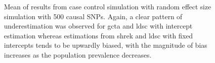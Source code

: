 \begin{figure}
{				
				\label{fig:ldscInCC500RandMean}
			}
			\caption[Mean of Case Control Simulation Results (500 Causal)]
			{Mean of results from case control simulation with random effect size simulation with 500 causal \glspl{SNP}.
				Again, a clear pattern of underestimation was observed for \gls{gcta} and \gls{ldsc} with intercept estimation whereas estimations from \gls{shrek} and \gls{ldsc} with fixed intercepts tends to be upwardly biased, with the magnitude of bias increases as the population prevalence decreases.
				} 
			\label{fig:CC500RandMean}
		\end{figure}
		
